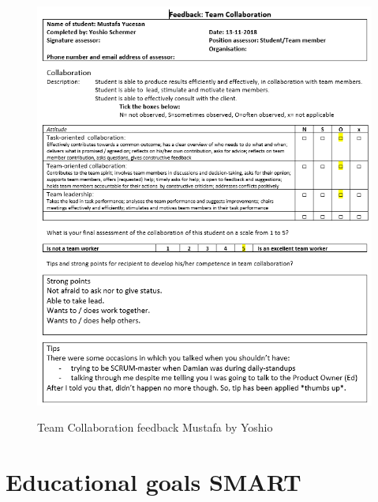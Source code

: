 \documentclass[12pt]{article}
\begin{document}
	\begin{figure}[p!]
		\centering
		\includegraphics[width=\columnwidth]{CoopMustafa3.PNG}\\
		\caption{Team Collaboration feedback Mustafa by Yoshio}
	\end{figure}
	\newpage
	\section{Educational goals SMART}
\end{document}
